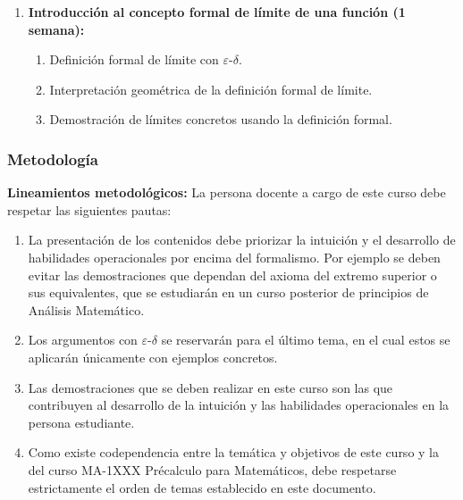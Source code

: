 \begin{refsection}
\begin{enumerate}
\item \textbf{Introducción al concepto formal de límite de una función (1 semana):} 
\begin{enumerate}
    \item Definición formal de límite con $\varepsilon$-$\delta$.
    \item Interpretación geométrica de la definición formal de límite.
    \item Demostración de límites concretos usando la definición formal. 
\end{enumerate}

\end{enumerate}

\subsubsection*{Metodología}

\noindent \textbf{Lineamientos metodológicos:} La persona docente a cargo de este curso debe respetar las siguientes pautas:
\begin{enumerate}
    \item La presentación de los contenidos debe priorizar la intuición y el desarrollo de habilidades operacionales por encima del formalismo. Por ejemplo se deben evitar las demostraciones que dependan del axioma del extremo superior o sus equivalentes, que se estudiarán en un curso posterior de principios de Análisis Matemático.
    \item Los argumentos con $\varepsilon$-$\delta$ se reservarán para el último tema, en el cual estos se aplicarán únicamente con ejemplos concretos.
    \item Las demostraciones que se deben realizar en este curso son las que contribuyen al desarrollo de la intuición y las habilidades operacionales en la persona estudiante.
    \item Como existe codependencia entre la temática y objetivos de este curso y la del curso MA-1XXX Précalculo para Matemáticos, debe respetarse estrictamente el orden de temas establecido en este documento.
\end{enumerate}


\end{refsection}

